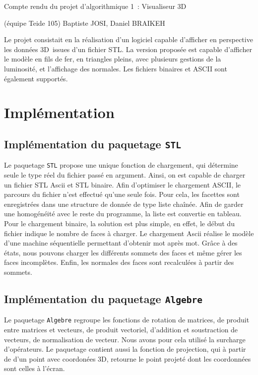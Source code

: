 \documentclass[10pt]{article}
\begin{document}
\begin{center} Compte rendu du projet d'algorithmique 1 : Visualiseur 3D \end{center}
\begin{center} (équipe Teide 105) Baptiste JOSI, Daniel BRAIKEH \end{center}


Le projet consistait en la réalisation d'un logiciel capable d'afficher en perspective les données 3D issues d'un fichier STL.
La version proposée est capable d'afficher le modèle en fils de fer, en triangles pleins, avec plusieurs gestions de la luminosité, et l'affichage des normales. Les fichiers binaires et ASCII sont également supportés.


\section{Implémentation}

\subsection{Implémentation du paquetage {\tt STL}}
Le paquetage {\tt STL} propose une unique fonction de chargement, qui détermine seule le type réel du fichier passé en argument. Ainsi, on est capable de charger un fichier STL Ascii et STL binaire. Afin d'optimiser le chargement ASCII, le parcours du fichier n'est effectué qu'une seule fois. Pour cela, les facettes sont enregistrées dans une structure de donnée de type liste chaînée. Afin de garder une homogénéité avec le reste du programme, la liste est convertie en tableau. Pour le chargement binaire, la solution est plus simple, en effet, le début du fichier indique le nombre de faces à charger.
Le chargement Ascii réalise le modèle d'une machine séquentielle permettant d'obtenir mot après mot. Grâce à des états, nous pouvons charger les différents sommets des faces et même gérer les faces incomplètes. Enfin, les normales des faces sont recalculées à partir des sommets.

\subsection{Implémentation du paquetage {\tt Algebre}}
Le paquetage {\tt Algebre} regroupe les fonctions de rotation de matrices, de produit entre matrices et vecteurs, de produit vectoriel, d'addition et soustraction de vecteurs, de normalisation de vecteur. Nous avons pour cela utilisé la surcharge d'opérateurs.
Le paquetage contient aussi la fonction de projection, qui à partir de d'un point avec coordonées 3D, retourne le point projeté dont les coordonnées sont celles à l'écran.
\end{document}
